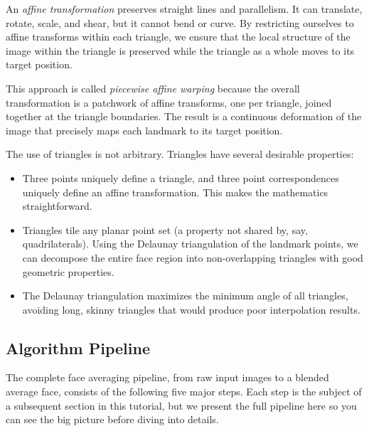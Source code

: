 An \emph{affine transformation} preserves straight lines and parallelism. It can translate,
rotate, scale, and shear, but it cannot bend or curve. By restricting ourselves to affine
transforms within each triangle, we ensure that the local structure of the image within the
triangle is preserved while the triangle as a whole moves to its target position.

This approach is called \emph{piecewise affine warping} because the overall transformation is
a patchwork of affine transforms, one per triangle, joined together at the triangle boundaries.
The result is a continuous deformation of the image that precisely maps each landmark to its
target position.

The use of triangles is not arbitrary. Triangles have several desirable properties:

\begin{itemize}
    \item Three points uniquely define a triangle, and three point correspondences uniquely define
    an affine transformation. This makes the mathematics straightforward.
    \item Triangles tile any planar point set (a property not shared by, say, quadrilaterals).
    Using the Delaunay triangulation of the landmark points, we can decompose the entire face
    region into non-overlapping triangles with good geometric properties.
    \item The Delaunay triangulation maximizes the minimum angle of all triangles, avoiding
    long, skinny triangles that would produce poor interpolation results.
\end{itemize}


\subsection{Algorithm Pipeline}

The complete face averaging pipeline, from raw input images to a blended average face, consists of
the following five major steps. Each step is the subject of a subsequent section in this tutorial,
but we present the full pipeline here so you can see the big picture before diving into details.

